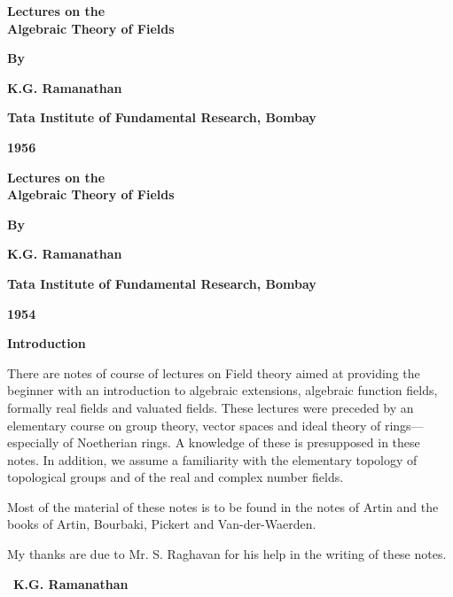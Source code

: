 \thispagestyle{empty}

\begin{center}
{\Large\bfseries Lectures on the}\\[5pt]
{\Large\bfseries Algebraic Theory of Fields}
\vskip 1cm

{\bf By}
\medskip

{\large\bf K.G. Ramanathan}
\vfill 

{\bf Tata Institute of Fundamental Research, Bombay}

{\bf 1956}
\end{center}
\eject

\thispagestyle{empty}

\begin{center}
{\Large\bfseries Lectures on the}\\[5pt]
{\Large\bfseries Algebraic Theory of Fields}
\vskip 1cm

{\bf By}
\medskip

{\large\bf K.G. Ramanathan}
\vfill 

{\bf Tata Institute of Fundamental Research, Bombay}

{\bf 1954}
\end{center}

\eject

\thispagestyle{empty}
\begin{center}
{\huge\bf Introduction}
\end{center}

There are notes of course of lectures on Field theory aimed at
providing the beginner with an introduction to algebraic extensions,
algebraic function fields, formally real fields and valuated fields.
These lectures were preceded by an elementary course on group theory,
vector spaces and ideal theory of rings---especially of Noetherian rings.
A knowledge of these is presupposed in these notes. In addition, we 
assume a familiarity with the elementary topology of topological groups 
and of the real and complex number fields. 

Most of the material of these notes is to be found in the 
notes of Artin and the books of Artin, Bourbaki, Pickert and
Van-der-Waerden.

My thanks are due to Mr. S. Raghavan for his help in the writing of these
notes.
\bigskip

~\hfill {\large\bf K.G. Ramanathan}
